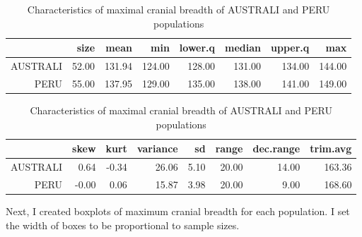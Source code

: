 \documentclass[12pt, oneside]{report}\usepackage[]{graphicx}\usepackage[]{color}
\begin{document}
\begin{table}[ht]
\centering
\begin{tabular}{rrrrrrrr}
  \hline
 & size & mean & min & lower.q & median & upper.q & max \\ 
  \hline
AUSTRALI & 52.00 & 131.94 & 124.00 & 128.00 & 131.00 & 134.00 & 144.00 \\ 
  PERU & 55.00 & 137.95 & 129.00 & 135.00 & 138.00 & 141.00 & 149.00 \\ 
   \hline
\end{tabular}
\caption{Characteristics of maximal cranial breadth of AUSTRALI and PERU populations} 
\end{table}
\begin{table}[ht]
\centering
\begin{tabular}{rrrrrrrr}
  \hline
 & skew & kurt & variance & sd & range & dec.range & trim.avg \\ 
  \hline
AUSTRALI & 0.64 & -0.34 & 26.06 & 5.10 & 20.00 & 14.00 & 163.36 \\ 
  PERU & -0.00 & 0.06 & 15.87 & 3.98 & 20.00 & 9.00 & 168.60 \\ 
   \hline
\end{tabular}
\caption{Characteristics of maximal cranial breadth of AUSTRALI and PERU populations} 
\end{table}


\bigskip
Next, I created boxplots of maximum cranial breadth for each population. I set the width of boxes to be proportional to sample sizes.
\end{document}
